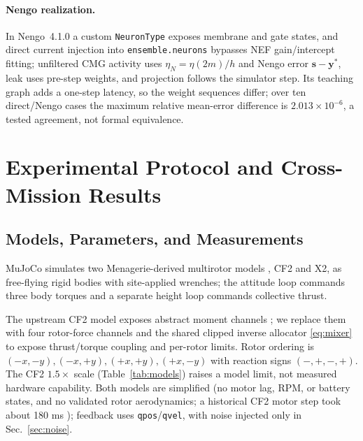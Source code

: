 \documentclass[letterpaper, 10 pt, conference]{ieeeconf}
\begin{document}
\paragraph{Nengo realization.}
In Nengo~4.1.0 a custom \texttt{NeuronType} exposes membrane and gate states, and direct current injection into \texttt{ensemble.neurons} bypasses NEF gain/intercept fitting; unfiltered CMG activity uses $\eta_N=\eta(2m)/h$ and Nengo error $\bm s-\bm y^*$, leak uses pre-step weights, and projection follows the simulator step. Its teaching graph adds a one-step latency, so the weight sequences differ; over ten direct/Nengo cases the maximum relative mean-error difference is $2.013\times10^{-6}$, a tested agreement, not formal equivalence.


\section{Experimental Protocol and Cross-Mission Results}
\label{sec:results}
\subsection{Models, Parameters, and Measurements}

MuJoCo \cite{todorov2012mujoco} simulates two Menagerie-derived multirotor models \cite{menagerieModels}, CF2 and X2, as free-flying rigid bodies with site-applied wrenches; the attitude loop commands three body torques and a separate height loop commands collective thrust.

The upstream CF2 model exposes abstract moment channels \cite{menagerieCF2}; we replace them with four rotor-force channels and the shared clipped inverse allocator \eqref{eq:mixer} to expose thrust/torque coupling and per-rotor limits. Rotor ordering is $(-x,-y),(-x,+y),(+x,+y),(+x,-y)$ with reaction signs $(-,+,-,+)$. The CF2 $1.5\times$ scale (Table~\ref{tab:models}) raises a model limit, not measured hardware capability. Both models are simplified (no motor lag, RPM, or battery states, and no validated rotor aerodynamics; a historical CF2 motor step took about 180 ms \cite{bitcrazeMotorResponse}); feedback uses \texttt{qpos}/\texttt{qvel}, with noise injected only in Sec.~\ref{sec:noise}.
\end{document}
